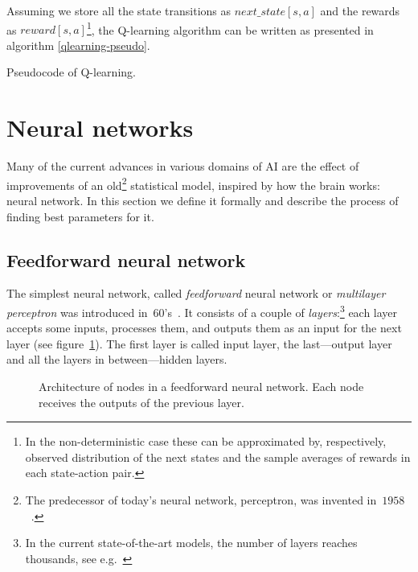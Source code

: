Assuming we store all the state transitions as $next\_state[s, a]$ and the rewards as $reward[s, a]$\footnote{In the non-deterministic case these can be approximated by, respectively, observed distribution of the next states and the sample averages of rewards in each state-action pair.}, the Q-learning algorithm can be written as presented in algorithm \ref{qlearning-pseudo}. 

\begin{algorithm} \label{qlearning-pseudo}
  \caption{Pseudocode of Q-learning.}
\end{algorithm}
\section{Neural networks}
Many of the current advances in various domains of AI are the effect of improvements of an old\footnote{The predecessor of today's neural network, perceptron, was invented in~$1958$~\cite{perceptron}.} statistical model, inspired by how the brain works: neural network. In this section we define it formally and describe the process of finding best parameters for it.

\subsection{Feedforward neural network}
The simplest neural network, called \emph{feedforward} neural network or \emph{multilayer perceptron} was introduced in~60's~\cite{mlp}.
It consists of a couple of \emph{layers}:\footnote{In the current state-of-the-art models, the number of layers reaches thousands, see e.g.~\cite{stochastic}} each layer accepts some inputs, processes them, and outputs them as an input for the next layer (see figure~\ref{ann-layers}). The first layer is called input layer, the last---output layer and all the layers in between---hidden layers.
\begin{figure}[h]
  \centering
  \resizebox{0.6\textwidth}{!}{
  
  }
  \caption{Architecture of nodes in a feedforward neural network. Each node receives the outputs of the previous layer.}\label{ann-layers} 
\end{figure}

